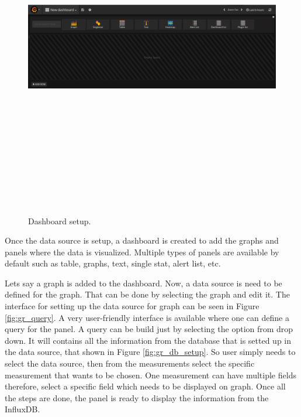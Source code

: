  \begin{figure}[htpb]
	\centering
	\includegraphics[width=16cm,height=15cm,keepaspectratio=true]{images/dashboard}
	\caption{
		Dashboard setup.
	}
	\label{fig:dashboard}
\end{figure}

Once the data source is setup, a dashboard is created to add the graphs and panels where the data is visualized. Multiple types of panels are available by default such as table, graphs, text, single stat, alert list, etc.

Lets say a graph is added to the dashboard. Now, a data source is need to be defined for the graph. That can be done by selecting the graph and edit it. The interface for setting up the data source for graph can be seen in Figure \ref{fig:gr_query}. A very user-friendly interface is available where one can define a query for the panel. A query can be build just by selecting the option from drop down. It will contains all the information from the database that is setted up in the data source, that shown in Figure \ref{fig:gr_db_setup}. So user simply needs to select the data source, then from the measurements select the specific measurement that wants to be chosen. One measurement can have multiple fields therefore, select a specific field which needs to be displayed on graph. Once all the steps are done, the panel is ready to display the information from the InfluxDB.


